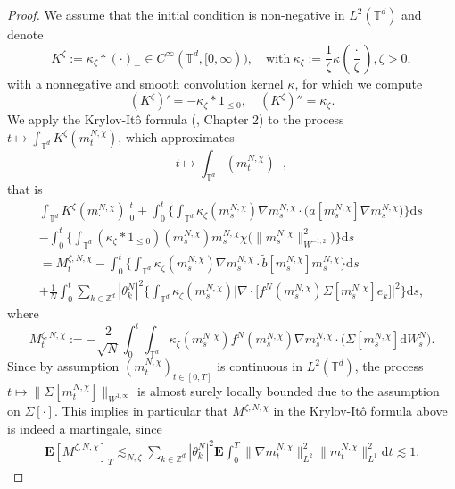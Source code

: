 \begin{proof}We assume that the initial condition is non-negative in $L^2(\mathbb{T}^d)$ and denote
\[
K^{\zeta} := \kappa_{\zeta} \ast (\cdot)_- \in C^{\infty}(\mathbb{T}^d, [0,\infty)), \quad \text{with} \
\kappa_{\zeta} := \frac{1}{\zeta}\kappa(\frac{\cdot}{\zeta}), \zeta > 0, 
\]
with a nonnegative and smooth convolution kernel $\kappa$, for which we compute 
\[
(K^{\zeta})' = - \kappa_{\zeta} \ast \mathrm{1}_{\leq 0}, \quad (K^{\zeta})'' =  \kappa_{\zeta}.
\]
 We apply the Krylov-It\^o formula (\cite{K13}, Chapter 2) to the process $t \mapsto \int_{\mathbb{T}^d}K^{\zeta}(m_t^{N,\chi})$, which approximates 
 \[
 t \mapsto \int_{\mathbb{T}^d}(m_t^{N,\chi})_-,
 \]
 that is 
\begin{equation*}
\begin{split}
     \int_{\mathbb{T}^d} K^{\zeta}(m^{N,\chi}_{\cdot})\Big|_0^t 
     + \int_0^t\Big\{\int_{\mathbb{T}^d} \kappa_{\zeta}(m_s^{N,\chi}) \nabla m_s^{N,\chi} \cdot \big(a[m_s^{N,\chi}]\nabla m_s^{N,\chi}\big) \Big\}\mathrm{d}s \\
     - \int_0^t\Big\{\int_{\mathbb{T}^d} (\kappa_{\zeta}\ast \mathrm{1}_{\leq 0})(m_s^{N,\chi} )  m_s^{N,\chi} \chi\big( \|m^{N,\chi}_s\|_{W^{-1,2}}^2\big) \Big\}\mathrm{d}s\\
     = M^{\zeta,N,\chi}_t - \int_0^t\Big\{\int_{\mathbb{T}^d}\kappa_{\zeta}(m_s^{N,\chi}) \nabla m_s^{N,\chi} \cdot \tilde{b}[m^{N,\chi}_s]m^{N,\chi}_s \Big\}\mathrm{d}s \\ 
    + \frac{1}{N}\int_0^t\sum_{k \in \mathbb{Z}^d}|\theta_k^N|^2 \Big\{\int_{\mathbb{T}^d} \kappa_{\zeta}(m_s^{N,\chi})\Big|\nabla \cdot \Big[f^N(m_s^{N,\chi} ) \Sigma[m_s^{N,\chi}] e_k\Big]\Big|^2\Big\}\mathrm{d}s,
\end{split}
\end{equation*}
where
\[
M^{\zeta,N,\chi}_t := -\frac{2}{\sqrt{N}}\int_0^t \int_{\mathbb{T}^d} \kappa_{\zeta}(m_s^{N,\chi})f^N(m_s^{N,\chi})\nabla m_s^{N,\chi} \cdot \big(\Sigma[m_s^{N,\chi}]\mathrm{d}W^N_s\big).
\]
Since by assumption $(m^{N,\chi}_t)_{t \in [0,T]}$ is continuous in $L^2(\mathbb{T}^d)$, the process $t \mapsto \|\Sigma[m_t^{N,\chi}]\|_{W^{1,\infty}}$ is almost surely locally bounded due to the assumption on $\Sigma[\cdot]$. This implies in particular that $M^{\zeta,N,\chi}$
in the Krylov-It\^o formula above is indeed a martingale, since 
 \begin{align*}
 \mathbf{E}[M^{\zeta,N,\chi}]_T \lesssim_{N,\zeta} \sum_{k \in \mathbb{Z}^d}|\theta_k^N|^2 \mathbf{E}\int_0^T\|\nabla m_t^{N,\chi}\|^2_{L^2}\|m_t^{N,\chi}\|^2_{L^1}\mathrm{d}t \lesssim1.

\end{align*}
\end{proof}
